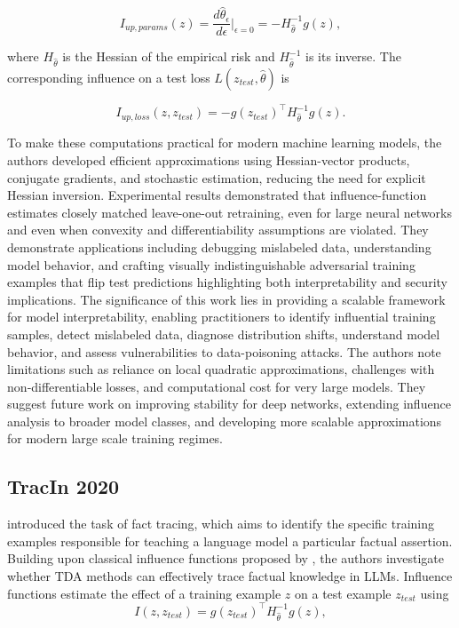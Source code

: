 \documentclass{article}
\newcommand{\hth}{\hat{\theta}}                 %
\newcommand{\Hh}{H_{\hat{\theta}}}              %
\newcommand{\gr}[1]{g(#1)}                      %
\begin{document}
\begin{equation}\label{eq:lit-up-params}
    I_{up,params}(z)
    =
    \frac{d\hth_{\epsilon}}{d\epsilon}
    \Big|_{\epsilon=0}
    =
    -\Hh^{-1}\gr{z},
\end{equation}

where $\Hh$ is the Hessian of the empirical risk and $\Hh^{-1}$ is its inverse. The corresponding influence on a test loss $L(z_{test},\hth)$ is

\begin{equation}\label{eq:lit-up-loss}
    I_{up,loss}(z,z_{test}) = -\gr{z_{test}}^\top\Hh^{-1}\gr{z}.
\end{equation}

To make these computations practical for modern machine learning models, the authors developed efficient approximations using Hessian-vector products, conjugate gradients, and stochastic estimation, reducing the need for explicit Hessian inversion. Experimental results demonstrated that influence-function estimates closely matched leave-one-out retraining, even for large neural networks and even when convexity and differentiability assumptions are violated. They demonstrate applications including debugging mislabeled data, understanding model behavior, and crafting visually indistinguishable adversarial training examples that flip test predictions highlighting both interpretability and security implications. The significance of this work lies in providing a scalable framework for model interpretability, enabling practitioners to identify influential training samples, detect mislabeled data, diagnose distribution shifts, understand model behavior, and assess vulnerabilities to data-poisoning attacks. The authors note limitations such as reliance on local quadratic approximations, challenges with non‑differentiable losses, and computational cost for very large models. They suggest future work on improving stability for deep networks, extending influence analysis to broader model classes, and developing more scalable approximations for modern large scale training regimes.


\subsection{TracIn 2020}
\textcite{tracein} introduced the task of fact tracing, which aims to identify the specific training examples responsible for teaching a language model a particular factual assertion. Building upon classical influence functions proposed by \textcite{influence-functions-2017}, the authors investigate whether TDA methods can effectively trace factual knowledge in LLMs. Influence functions estimate the effect of a training example $z$ on a test example $z_{test}$ using
\begin{equation}\label{eq:lit-tracin-if}
    I(z,z_{test}) = \gr{z_{test}}^\top\Hh^{-1}\gr{z},
\end{equation}
\end{document}
